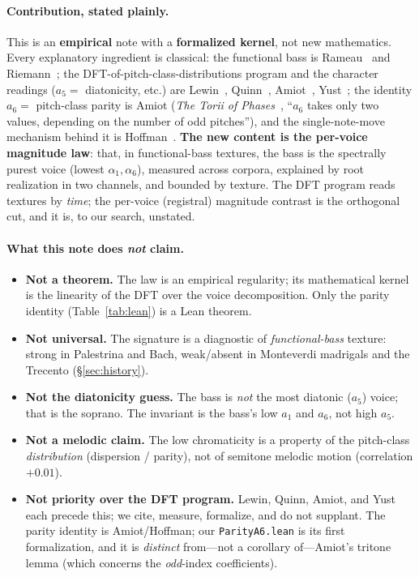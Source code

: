 \documentclass[11pt]{article}
\newcommand{\lean}[1]{\texttt{#1}}
\begin{document}
\paragraph{Contribution, stated plainly.} This is an \textbf{empirical} note with a \textbf{formalized
kernel}, not new mathematics. Every explanatory ingredient is classical: the functional bass is
Rameau~\cite{Rameau} and Riemann~\cite{Riemann}; the DFT-of-pitch-class-distributions program and the
character readings ($a_5=$ diatonicity, etc.) are Lewin~\cite{Lewin1959}, Quinn~\cite{Quinn},
Amiot~\cite{Amiot}, Yust~\cite{Yust2017,Yust2019}; the identity $a_6=$ pitch-class parity is Amiot
(\emph{The Torii of Phases}~\cite{Torii}, ``$a_6$ takes only two values, depending on the number of odd
pitches''), and the single-note-move mechanism behind it is Hoffman~\cite{Hoffman}. \textbf{The new content
is the per-voice magnitude law}: that, in functional-bass textures, the bass is the spectrally purest voice
(lowest $\alpha_1,\alpha_6$), measured across corpora, explained by root realization in two channels, and
bounded by texture. The DFT program reads textures by \emph{time}; the per-voice (registral) magnitude
contrast is the orthogonal cut, and it is, to our search, unstated.

\paragraph{What this note does \emph{not} claim.}
\begin{itemize}\itemsep2pt
  \item \textbf{Not a theorem.} The law is an empirical regularity; its mathematical kernel is the linearity
        of the DFT over the voice decomposition. Only the parity identity (Table~\ref{tab:lean}) is a Lean
        theorem.
  \item \textbf{Not universal.} The signature is a diagnostic of \emph{functional-bass} texture: strong in
        Palestrina and Bach, weak/absent in Monteverdi madrigals and the Trecento (\S\ref{sec:history}).
  \item \textbf{Not the diatonicity guess.} The bass is \emph{not} the most diatonic ($a_5$) voice; that is
        the soprano. The invariant is the bass's low $a_1$ and $a_6$, not high $a_5$.
  \item \textbf{Not a melodic claim.} The low chromaticity is a property of the pitch-class
        \emph{distribution} (dispersion / parity), not of semitone melodic motion (correlation $+0.01$).
  \item \textbf{Not priority over the DFT program.} Lewin, Quinn, Amiot, and Yust each precede this; we
        cite, measure, formalize, and do not supplant. The parity identity is Amiot/Hoffman; our
        \lean{ParityA6.lean} is its first formalization, and it is \emph{distinct} from---not a corollary
        of---Amiot's tritone lemma (which concerns the \emph{odd}-index coefficients).
\end{itemize}
\end{document}
